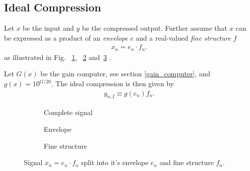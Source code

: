 \documentclass[../main2.tex]{subfiles}
\providecommand{\rootdir}{..}
\begin{document}
\subsection{Ideal Compression} \label{ideal_compression}
Let $x$ be the input and $y$ be the compressed output. Further assume that $x$ can be expressed as a product of an \emph{envelope} $e$ and a real-valued \emph{fine structure} $f$ 
\begin{align}
x_n = e_n\cdot f_n.
\end{align}
as illustrated in Fig. ~\ref{fig:signal_env_fine_struct}, ~\ref{fig:signal_env} and~\ref{fig:signal_fine_struct} . 

Let $G(x)$ be the gain computer, see section \ref{gain_computer}, and $g(x) = 10^{G/20}$. The ideal compression is then given by
\begin{align}
y_{n,I} \equiv g(e_n) f_n. 
\end{align}
\begin{figure}
\captionsetup{justification=centering}
\begin{subfigure}{\linewidth}
\centering
\centerline{}
\caption{Complete signal}
\label{fig:signal_env_fine_struct}
\end{subfigure}
\par\bigskip
\begin{subfigure}{.5\linewidth}
\centering

\caption{Envelope}
\label{fig:signal_env}
\end{subfigure}
\begin{subfigure}{.5\linewidth}
\centering

\caption{Fine structure}
\label{fig:signal_fine_struct}
\end{subfigure}%
\caption{Signal $x_n = e_n\cdot f_n$ split into it's envelope $e_n$ and fine structure $f_n$.}
\label{fig:analytic_signal}
\end{figure}
\end{document}
